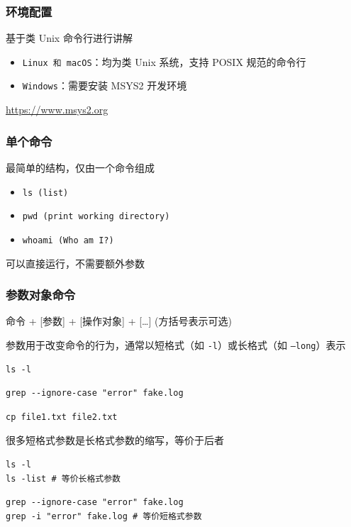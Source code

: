 \documentclass[UTF8, 16pt]{beamer}
\begin{document}
\begin{frame}
    \frametitle{环境配置}
    \textcolor{sufered}{基于类 Unix 命令行进行讲解}

    \begin{itemize}
        \item \texttt{Linux 和 macOS}：均为类 Unix 系统，支持 POSIX 规范的命令行
        \item \texttt{Windows}：需要安装 MSYS2 开发环境
    \end{itemize}
    \url{https://www.msys2.org}
\end{frame}

\begin{frame}
    \frametitle{单个命令}
    \textcolor{sufered}{最简单的结构，仅由一个命令组成}

    \begin{itemize}
        \item \texttt{ls (list)}
        \item \texttt{pwd (print working directory)}
        \item \texttt{whoami (Who am I?)}
    \end{itemize}
    可以直接运行，不需要额外参数
\end{frame}

\begin{frame}[fragile]
    \frametitle{参数对象命令}
    \textcolor{sufered}{命令 + [参数] + [操作对象] + [\dots] (方括号表示可选)}

    参数用于改变命令的行为，通常以短格式（如 \texttt{-l}）或长格式（如 \texttt{--long}）表示
    \begin{lstlisting}[numbers=none]
ls -l\end{lstlisting}
    \begin{lstlisting}[numbers=none]
grep --ignore-case "error" fake.log\end{lstlisting}
    \begin{lstlisting}[numbers=none]
cp file1.txt file2.txt\end{lstlisting}
\end{frame}

\begin{frame}[fragile]
    很多短格式参数是长格式参数的缩写，等价于后者
    \begin{lstlisting}
ls -l
ls -list # 等价长格式参数\end{lstlisting}
    \begin{lstlisting}
grep --ignore-case "error" fake.log
grep -i "error" fake.log # 等价短格式参数\end{lstlisting}
\end{frame}
\end{document}
